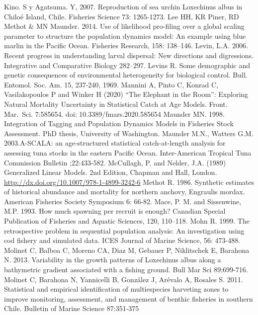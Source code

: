 \documentclass[
]{article}
\begin{document}
Kino. S y Agatsuma. Y, 2007. Reproduction of sea urchin Loxechinus albus
in Chiloé Island, Chile. Fisheries Science 73: 1265-1273. Lee HH, KR
Piner, RD Methot \& MN Maunder. 2014. Use of likelihood pro-filing over
a global scaling parameter to structure the population dynamics model:
An example using blue marlin in the Pacific Ocean. Fisheries Research,
158: 138--146. Levin, L.A. 2006. Recent progress in understanding larval
dispersal: New directions and digressions. Integrative and Comparative
Biology 282--297. Levins R. Some demographic and genetic consequences of
environmental heterogeneity for biological control. Bull. Entomol. Soc.
Am. 15, 237-240, 1969. Mannini A, Pinto C, Konrad C, Vasilakopoulos P
and Winker H (2020) ``The Elephant in the Room'': Exploring Natural
Mortality Uncertainty in Statistical Catch at Age Models. Front.
Mar.~Sci. 7:585654. doi: 10.3389/fmars.2020.585654 Maunder MN. 1998.
Integration of Tagging and Population Dynamics Models in Fisheries Stock
Assessment. PhD thesis, University of Washington. Maunder M.N., Watters
G.M. 2003.A-SCALA: an age-structured statistical catch-at-length
analysis for assessing tuna stocks in the eastern Pacific Ocean.
Inter-American Tropical Tuna Commission Bulletin ;22:433-582. McCullagh,
P. and Nelder, J.A. (1989) Generalized Linear Models. 2nd Edition,
Chapman and Hall, London.
\url{http://dx.doi.org/10.1007/978-1-4899-3242-6} Methot R. 1986.
Synthetic estimates of historical abundance and mortality for northern
anchovy, Engraulis mordax. American Fisheries Society Symposium 6:
66-82. Mace, P. M. and Sissenwine, M.P. 1993. How much spawning per
recruit is enough? Canadian Special Publication of Fisheries and Aquatic
Sciences, 120, 110--118. Mohn R. 1999. The retrospective problem in
sequential population analysis: An investigation using cod fishery and
simulated data. ICES Journal of Marine Science, 56: 473-488. Molinet C,
Balboa C, Moreno CA, Diaz M, Gebauer P, Niklitschek E, Barahona N. 2013.
Variability in the growth patterns of Loxechinus albus along a
bathymetric gradient associated with a fishing ground. Bull Mar Sci
89:699-716. Molinet C, Barahona N, Yannicelli B, González J, Arévalo A,
Rosales S. 2011. Statistical and empirical identification of
multiespecies harveting zones to improve monitoring, assessment, and
management of benthic fisheries in southern Chile. Bulletin of Marine
Science 87:351-375
\end{document}
